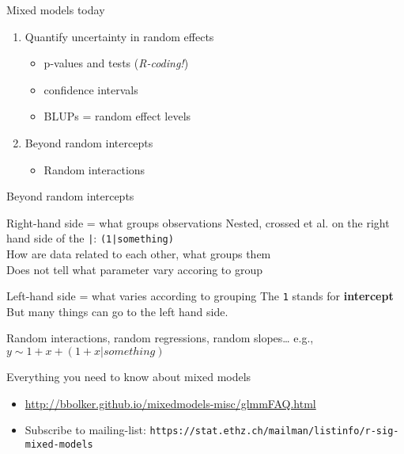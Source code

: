 \documentclass{beamer}
\begin{document}
\begin{frame}{Mixed models today}
 
 \begin{enumerate}
 \large
  \item Quantify uncertainty in random effects
    \begin{itemize}
     \item p-values and tests (\textit{R-coding!})
     \item confidence intervals
     \item BLUPs = random effect levels
    \end{itemize}
  \item Beyond random intercepts
    \begin{itemize}
     \item Random interactions
    \end{itemize}

 \end{enumerate}
 

\end{frame}

\begin{frame}{Beyond random intercepts}


\begin{alertblock}{Right-hand side = what groups observations}
Nested, crossed et al. on the right hand side of the \texttt{|}: \texttt{(1|something)}\\
How are data related to each other, what groups them\\
Does not tell what parameter vary accoring to group
\end{alertblock}


\pause
\begin{alertblock}{Left-hand side = what varies according to grouping}
The \texttt{1} stands for \textbf{intercept}\\
But many things can go to the left hand side. 
\end{alertblock}

\pause

\begin{exampleblock}{Random interactions, random regressions, random slopes\dots}
 e.g., $y \sim 1 + x + (1 + x|something)$
\end{exampleblock}
 
\end{frame}



\begin{frame}{Everything you need to know about mixed models}

\begin{itemize}
 \item \url{http://bbolker.github.io/mixedmodels-misc/glmmFAQ.html}
 \item Subscribe to mailing-list: \texttt{https://stat.ethz.ch/mailman/listinfo/r-sig-mixed-models}
\end{itemize}

\end{frame}
\end{document}
